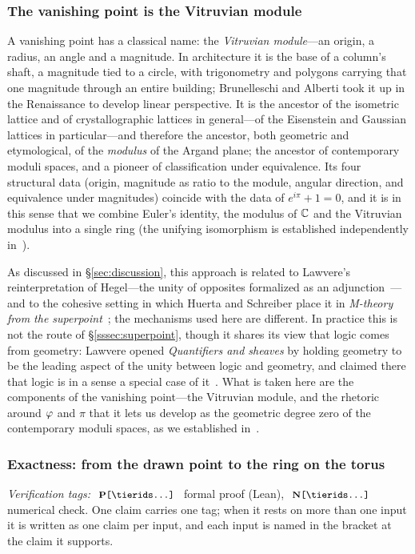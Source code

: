 \subsubsection{The vanishing point is the Vitruvian module}
A vanishing point has a classical name: the \emph{Vitruvian module}---an origin, a radius, an
angle and a magnitude. In architecture it is the base of a column's shaft, a magnitude tied to
a circle, with trigonometry and polygons carrying that one magnitude through an entire
building; Brunelleschi and Alberti took it up in the Renaissance to develop linear
perspective. It is the ancestor of the isometric lattice and of crystallographic lattices in
general---of the Eisenstein and Gaussian lattices in particular---and therefore the ancestor,
both geometric and etymological, of the \emph{modulus} of the Argand plane; the ancestor of
contemporary moduli spaces, and a pioneer of classification under equivalence. Its four
structural data (origin, magnitude as ratio to the module, angular direction, and equivalence
under magnitudes) coincide with the data of $e^{i\pi}+1=0$, and it is in this sense that we
combine Euler's identity, the modulus of $\mathbb{C}$ and the Vitruvian modulus into a single ring
(the unifying isomorphism is established independently in~\cite{Corr}).

As discussed in \S\ref{sec:discussion}, this approach is related to Lawvere's reinterpretation of Hegel---the unity of opposites formalized as an adjunction~\cite{lawvere96unity}---and to the cohesive setting in which Huerta and Schreiber place it in \emph{M-theory from the superpoint}~\cite{huerta2018m}; the mechanisms used here are different. In practice this is not the route of \S\ref{sssec:superpoint}, though it shares its view that logic comes from geometry: Lawvere opened \emph{Quantifiers and sheaves} by holding geometry to be the leading aspect of the unity between logic and geometry, and claimed there that logic is in a sense a special case of it~\cite{lawvere70quantifiers}. What is taken here are the components of the vanishing point---the Vitruvian module, and the rhetoric around $\varphi$ and $\pi$ that it lets us develop as the geometric degree zero of the contemporary moduli spaces, as we established in~\cite{HP}.

\subsubsection{Exactness: from the drawn point to the ring on the torus}

\noindent\emph{Verification tags:} $\witness[...]{P}$ formal proof (Lean), $\witness[...]{N}$ numerical check.
One claim carries one tag; when it rests on more than one input it is written as one claim per input, and each input is named in the bracket at the claim it supports.

